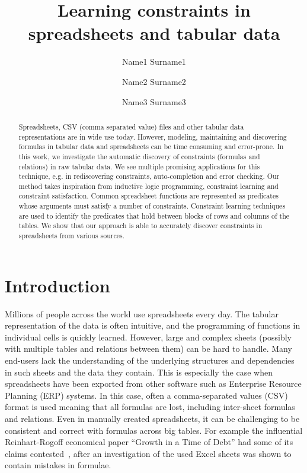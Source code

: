 





\title{Learning constraints in spreadsheets and tabular data}

\author{Name1 Surname1 \and Name2 Surname2 \and Name3 Surname3 \institute{----------------------} }

\maketitle

\begin{abstract}
Spreadsheets, CSV (comma separated value) files and other tabular data representations are in wide use today.
However, modeling, maintaining and discovering formulas in tabular data and spreadsheets can be time consuming and error-prone.
In this work, we investigate the automatic discovery of constraints (formulas and relations) in raw tabular data.
We see multiple promising applications for this technique, e.g. in rediscovering constraints, auto-completion and error checking.
Our method takes inspiration from inductive logic programming, constraint learning and constraint satisfaction.
Common spreadsheet functions are represented as predicates whose arguments must satisfy a number of constraints.
Constraint learning techniques are used to identify the predicates that hold between blocks of rows and columns of the tables.
We show that our approach is able to accurately discover constraints in spreadsheets from various sources.
\end{abstract}

\section{Introduction}
Millions of people across the world use spreadsheets every day.
The tabular representation of the data is often intuitive, and the programming of functions in individual cells is quickly learned.
However, large and complex sheets (possibly with multiple tables and relations between them) can be hard to handle.
Many end-users lack the understanding of the underlying structures and dependencies in such sheets and the data they contain.
This is especially the case when spreadsheets have been exported from other software such as Enterprise Resource Planning (ERP) systems.
In this case, often a comma-separated values (CSV) format is used meaning that all formulas are lost, including inter-sheet formulas and relations.
Even in manually created spreadsheets, it can be challenging to be consistent and correct with formulas across big tables.
For example the influential Reinhart-Rogoff economical paper ``Growth in a Time of Debt'' had some of its claims contested~\cite{flaw_excel}, after an investigation of the used Excel sheets was shown to contain mistakes in formulae.

